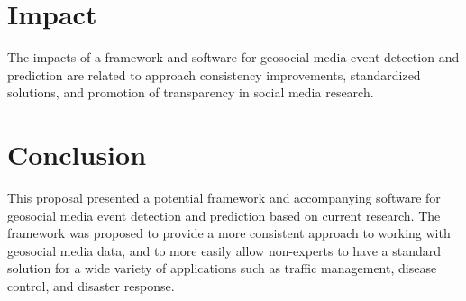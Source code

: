 

\section{Impact} \label{impact}

The impacts of a framework and software for geosocial media event detection and prediction are related to approach consistency improvements, standardized solutions, and promotion of transparency in social media research.




\section{Conclusion} \label{conclusion}

This proposal presented a potential framework and accompanying software for geosocial media event detection and prediction based on current research. The framework was proposed to provide a more consistent approach to working with  geosocial media data, and to more easily allow non-experts to have a standard solution for a wide variety of applications such as traffic management, disease control, and disaster response. 

